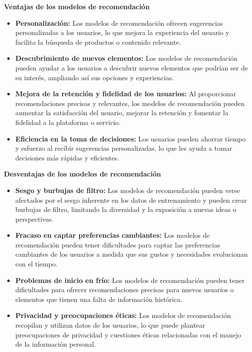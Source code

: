 \textbf{Ventajas de los modelos de recomendación}

\begin{itemize}
    \item \textbf{Personalización:} Los modelos de recomendación ofrecen sugerencias personalizadas a los usuarios, lo que mejora la experiencia del usuario y facilita la búsqueda de productos o contenido relevante.
    \item \textbf{Descubrimiento de nuevos elementos:} Los modelos de recomendación pueden ayudar a los usuarios a descubrir nuevos elementos que podrían ser de su interés, ampliando así sus opciones y experiencias.
    \item \textbf{Mejora de la retención y fidelidad de los usuarios:} Al proporcionar recomendaciones precisas y relevantes, los modelos de recomendación pueden aumentar la satisfacción del usuario, mejorar la retención y fomentar la fidelidad a la plataforma o servicio.
    \item \textbf{Eficiencia en la toma de decisiones:} Los usuarios pueden ahorrar tiempo y esfuerzo al recibir sugerencias personalizadas, lo que les ayuda a tomar decisiones más rápidas y eficientes.
\end{itemize}

\textbf{Desventajas de los modelos de recomendación}

\begin{itemize}
    \item \textbf{Sesgo y burbujas de filtro:} Los modelos de recomendación pueden verse afectados por el sesgo inherente en los datos de entrenamiento y pueden crear burbujas de filtro, limitando la diversidad y la exposición a nuevas ideas o perspectivas.
    \item \textbf{Fracaso en captar preferencias cambiantes:} Los modelos de recomendación pueden tener dificultades para captar las preferencias cambiantes de los usuarios a medida que sus gustos y necesidades evolucionan con el tiempo.
    \item \textbf{Problemas de inicio en frío:} Los modelos de recomendación pueden tener dificultades para ofrecer recomendaciones precisas para nuevos usuarios o elementos que tienen una falta de información histórica.
    \item \textbf{Privacidad y preocupaciones éticas:} Los modelos de recomendación recopilan y utilizan datos de los usuarios, lo que puede plantear preocupaciones de privacidad y cuestiones éticas relacionadas con el manejo de la información personal.
\end{itemize}